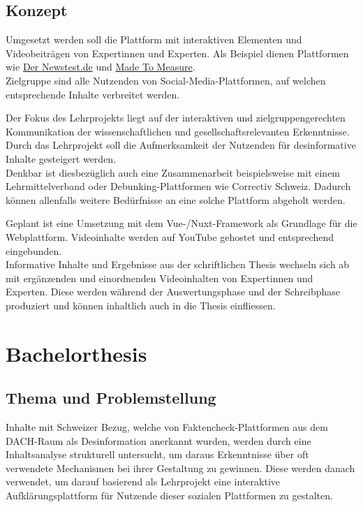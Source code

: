 \documentclass[12pt,a4paper]{article}        %
\begin{document}
\subsection{Konzept}
Umgesetzt werden soll die Plattform mit interaktiven Elementen und Videobeiträgen von Expertinnen und Experten. Als Beispiel dienen Plattformen wie \href{https://www.der-newstest.de}{Der Newstest.de} und \href{https://madetomeasure.online/de/}{Made To Measure}.\\
Zielgruppe sind alle Nutzenden von Social-Media-Plattformen, auf welchen entsprechende Inhalte verbreitet werden.

Der Fokus des Lehrprojekts liegt auf der interaktiven und zielgruppengerechten Kommunikation der wissenschaftlichen und gesellschaftsrelevanten Erkenntnisse. Durch das Lehrprojekt soll die Aufmerksamkeit der Nutzenden für desinformative Inhalte gesteigert werden. \\
Denkbar ist diesbezüglich auch eine Zusammenarbeit beispielsweise mit einem Lehrmittelverband oder Debunking-Plattformen wie Correctiv Schweiz. Dadurch können allenfalls weitere Bedürfnisse an eine solche Plattform abgeholt werden.

Geplant ist eine Umsetzung mit dem Vue-/Nuxt-Framework als Grundlage für die Webplattform. Videoinhalte werden auf YouTube gehostet und entsprechend eingebunden.\\
Informative Inhalte und Ergebnisse aus der schriftlichen Thesis wechseln sich ab mit ergänzenden und einordnenden Videoinhalten von Expertinnen und Experten. Diese werden während der Auswertungsphase und der Schreibphase produziert und können inhaltlich auch in die Thesis einfliessen.

\section{Bachelorthesis}
\subsection{Thema und Problemstellung}
Inhalte mit Schweizer Bezug, welche von Faktencheck-Plattformen aus dem DACH-Raum als Desinformation anerkannt wurden, werden durch eine Inhaltsanalyse strukturell untersucht, um daraus Erkenntnisse über oft verwendete Mechanismen bei ihrer Gestaltung zu gewinnen. Diese werden danach verwendet, um darauf basierend als Lehrprojekt eine interaktive Aufklärungsplattform für Nutzende dieser sozialen Plattformen zu gestalten.
\end{document}
